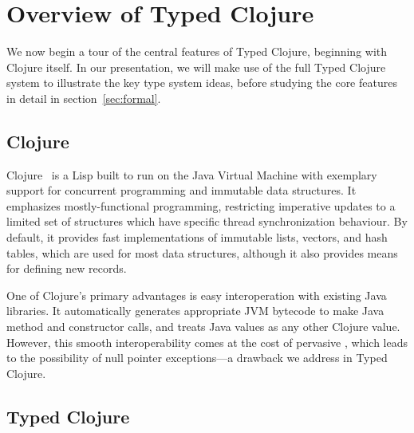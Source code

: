 \section{Overview of Typed Clojure}

\label{sec:overview}

We now begin a tour of the central features of Typed Clojure,
beginning with Clojure itself. In our presentation, we will make 
use of the full Typed Clojure system to illustrate the key type system
ideas, before studying the core features in detail in
section~\ref{sec:formal}. 

\subsection{Clojure}

Clojure~\cite{Hic08} is a Lisp built to run on the
Java Virtual Machine with exemplary support for concurrent programming
and immutable data structures. It emphasizes mostly-functional
programming, restricting imperative updates to a limited set of
structures which have specific thread synchronization behaviour. By
default, it provides fast implementations of immutable lists, vectors,
and hash tables, which are used for most data structures, although it
also provides means for defining new records.

One of Clojure's primary advantages is easy interoperation with
existing Java libraries. It automatically generates appropriate JVM
bytecode to make Java method and constructor calls, and treats Java
values as any other Clojure value. However, this smooth
interoperability comes at the cost of pervasive , which
leads to the possibility of null pointer exceptions---a drawback we
address in Typed Clojure.

%
%
%

\subsection{Typed Clojure}

